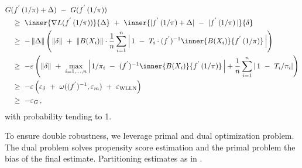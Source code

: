  \begin{align*}
   &
     G
     (
      f ^ { ' }
      \left( 
        1 / \pi 
      \right)
      +
      \Delta
     )
     \ 
     -
     \ 
     G
     (
      f ^ { ' }
      \left( 
        1 / \pi 
      \right)
     )
     \\
     &
     \quad
     \ge
     \ 
     \inner
     {
     \nabla 
     L
     (
      f ^ { ' }
      \left( 
        1 / \pi 
      \right)
     )
     }
     {
     \Delta
     }
     \ 
     +
     \ 
     \inner
     {
      | 
      f ^ { ' }
      \left( 
        1 / \pi 
      \right)
      +
      \Delta
     |
     \ 
      -
     \ 
     | 
      f ^ { ' }
      \left( 
        1 / \pi 
      \right)
     |
     }
     { \delta }
     \\
     &
     \quad
     \ge
     \ 
     -
     \norm{\Delta}
     \left( 
     \norm{\delta}
     \ 
     +
     \ 
     \norm{B(X_i)}
     \cdot
     \frac{1}{n}
     \sum_{i=1}^{n} 
     \left| 
     \,
      1
     \ 
      -
     \ 
        T_i
        \cdot
     (f ^ { ' }) ^ { -1 }
          \inner
          {B(X_i)}
          {
      f ^ { ' }
      \left( 
        1 / \pi 
      \right)
          }
          \,
     \right|
     \right)
     \\
     &
     \quad
     \ge
     \ 
     -
     \varepsilon
     \left( 
     \norm{\delta}
     \ 
     +
     \ 
     \max _ { i = 1,\ldots,n }
     \left| 
     \,
      1
      /
      \pi_i
     \ 
      -
     \ 
     (f ^ { ' }) ^ { -1 }
          \inner
          {B(X_i)}
          {
      f ^ { ' }
      \left( 
        1 / \pi 
      \right)
          }
          \,
     \right|
     +
     \frac{1}{n}
     \sum_{i=1}^{n} 
     \left| 
     \,
     1
     \ 
      -
     \ 
      T_i
      /
      \pi_i
     \right|
     \right)
     \\
     &
     \quad
     \ge
     \ 
     -
     \varepsilon
     \left( 
     \varepsilon _ {\delta}
     \ 
     +
     \ 
     \omega (
     (f ^ { ' }) ^ { -1 }
     ,
     \varepsilon _ m
     )
     \ 
     +
     \ 
     \varepsilon _ {\mathrm{WLLN}}
     \right)
     \\
     &
     \quad
     \ge
     \ 
     - \varepsilon _ G
     \,,
 \end{align*}
 with probability tending to 1.

\begin{takeaways}
  To ensure double robustness, we leverage primal and dual optimization
  problem. The dual problem solves propensity score estimation and the 
  primal problem the bias of the final estimate.
  Partitioning estimates as in \cite{Gyorfi2002}. 
\end{takeaways}

